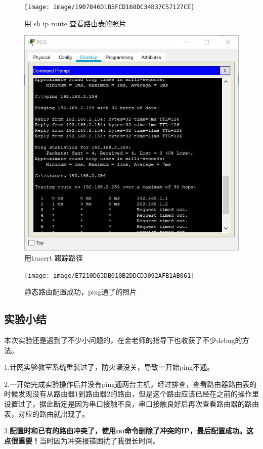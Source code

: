 \documentclass[lang=cn,11pt,a4paper,cite=authoryear]{elegantpaper}
\begin{document}
\begin{figure}[htbp]
	\centering
	\texttt{[image: image/1907846D1B5FCD168DC34B37C57127CE]}
	\caption{用 sh ip route 查看路由表的照片}
	\label{fig:1907846d1b5fcd168dc34b37c57127ce}
\end{figure}


\begin{figure}[htbp]
	\centering
	\includegraphics[width=0.7\linewidth]{image/QQ截图20201028235123}
	\caption{用tracert 跟踪路径}
	\label{fig:qq20201028235123}
\end{figure}

\begin{figure}[htbp]
	\centering
	\texttt{[image: image/E7210D63DB010B2DDCD3092AFB1AB061]}
	\caption{静态路由配置成功，ping通了的照片}
	\label{fig:e7210d63db010b2ddcd3092afb1ab061}
\end{figure}


\subsection{实验小结}

本次实验还是遇到了不少小问题的，在金老师的指导下也收获了不少debug的方法。

1.计网实验教室系统重装过了，防火墙没关，导致一开始ping不通。

2.一开始完成实验操作后并没有ping通两台主机，经过排查，查看路由器路由表的时候发现没有从路由器1到路由器2的路由，但是这个路由应该已经在之前的操作里设置过了，据此断定是因为串口接触不良，串口接触良好后再次查看路由器的路由表，对应的路由就出现了。

3.\textbf{配置时和已有的路由冲突了，使用no命令删除了冲突的IP，最后配置成功。这点很重要！}当时因为冲突报错困扰了我很长时间。
\end{document}
